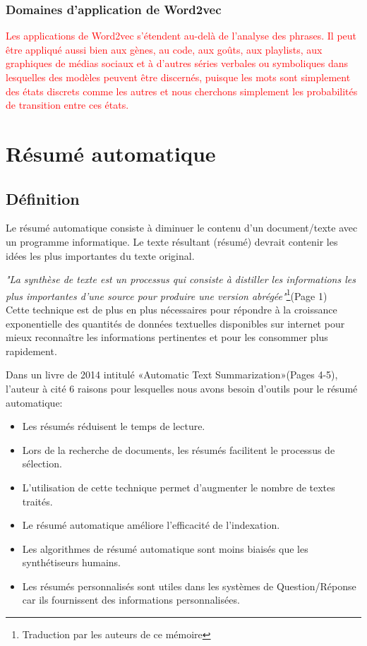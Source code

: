     
    
    
    \subsubsection{Domaines d'application de Word2vec}
     \textcolor{red}{Les applications de Word2vec s'étendent au-delà de l'analyse des phrases. Il peut être appliqué aussi bien aux gènes, au code, aux goûts, aux playlists, aux graphiques de médias sociaux et à d'autres séries verbales ou symboliques dans lesquelles des modèles peuvent être discernés, puisque les mots sont simplement des états discrets comme les autres et nous cherchons simplement les probabilités de transition entre ces états.}
    
    

\section{Résumé automatique}
    \subsection{Définition}
    Le résumé automatique consiste à diminuer le contenu d'un document/texte avec un programme informatique. Le texte résultant (résumé) devrait contenir les idées les plus importantes du texte original.

    \emph{"La synthèse de texte est un processus qui consiste à distiller les informations les plus importantes d'une source pour produire une version abrégée"}\footnote{Traduction par les auteurs de ce mémoire}\cite{aats}(Page 1)\\

    Cette technique est de plus en plus nécessaires pour répondre à la croissance exponentielle des quantités  de données textuelles disponibles sur internet pour mieux reconnaître les informations pertinentes et pour les consommer plus rapidement.

    Dans un livre de 2014 intitulé «Automatic Text Summarization»\cite{atsjmtm}(Pages 4-5), l'auteur à cité 6 raisons pour lesquelles nous avons besoin d'outils pour le résumé automatique:

    \begin{itemize}
        \item Les résumés réduisent le temps de lecture.
        \item Lors de la recherche de documents, les résumés facilitent le processus de sélection.
        \item L'utilisation de cette technique permet d'augmenter le nombre de textes traités.
        \item Le résumé automatique améliore l'efficacité de l'indexation.
        \item Les algorithmes de résumé automatique sont moins biaisés que les synthétiseurs humains.
        \item Les résumés personnalisés sont utiles dans les systèmes de Question/Réponse car ils fournissent des informations personnalisées.
    \end{itemize}


